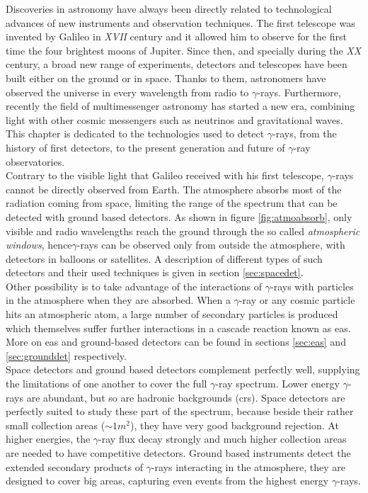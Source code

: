 \documentclass[main.tex]{subfiles}
\begin{document}
Discoveries in astronomy have always been directly related to technological advances of new instruments and observation techniques. The first telescope was invented by Galileo in \textit{XVII} century and it allowed him to observe for the first time the four brightest moons of Jupiter. Since then, and specially during the \textit{XX} century, a broad new range of experiments, detectors and telescopes have been built either on the ground or in space. Thanks to them, astronomers have observed the universe in every wavelength from radio to $\gamma$-rays. Furthermore, recently the field of multimessenger astronomy has started a new era, combining light with other cosmic messengers such as neutrinos and gravitational waves.\\

This chapter is dedicated to the technologies used to detect $\gamma$-rays, from the history of first detectors, to the present generation and future of $\gamma$-ray observatories.\\
Contrary to the visible light that Galileo received with his first telescope, $\gamma$-rays cannot be directly observed from Earth. The atmosphere absorbs most of the radiation coming from space, limiting the range of the spectrum that can be detected with ground based detectors. As shown in figure \ref{fig:atmoabsorb}, only visible and radio wavelengths reach the ground through the so called \textit{atmospheric windows}, hence$\gamma$-rays can be observed only from outside the atmosphere, with detectors in balloons or satellites. A description of different types of such detectors and their used techniques is given in section \ref{sec:spacedet}.\\

Other possibility is to take advantage of the interactions of $\gamma$-rays with particles in the atmosphere when they are absorbed. When a $\gamma$-ray or any cosmic particle hits an atmospheric atom, a large number of secondary particles is produced which themselves suffer further interactions in a cascade reaction known as \gls{eas}.
More on \gls{eas} and ground-based detectors can be found in sections \ref{sec:eas} and \ref{sec:grounddet} respectively.\\

Space detectors and ground based detectors complement perfectly well, supplying the limitations of one another to cover the full $\gamma$-ray spectrum. Lower energy $\gamma$-rays are abundant, but so are hadronic backgrounds (\glspl{cr}). Space detectors are perfectly suited to study these part of the spectrum, because beside their rather small collection areas ($\sim 1 m^2$), they have very good background rejection. At higher energies, the $\gamma$-ray flux decay strongly and much higher collection areas are needed to have competitive detectors. Ground based instruments detect the extended secondary products of $\gamma$-rays interacting in the atmosphere, they are designed to cover big areas, capturing even events from the highest energy $\gamma$-rays.\\
\end{document}
